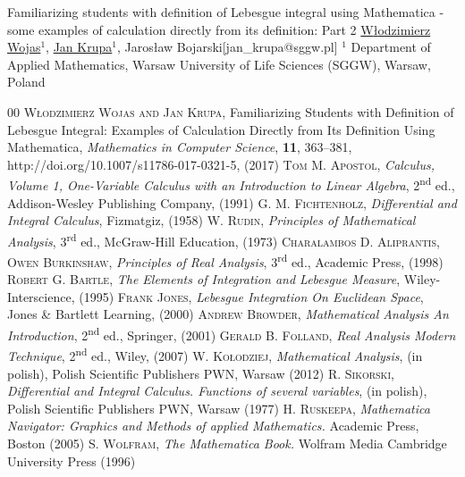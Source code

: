 \begin{abstract_online}{Familiarizing students with definition of Lebesgue integral  using Mathematica - some examples of calculation directly from its definition: Part 2}{%
        \underline{W{\l}odzimierz Wojas}$^{1}$, \underline{Jan Krupa}$^{1}$,  Jaros{\l}aw Bojarski}{[jan\_krupa@sggw.pl]
        }{%
        $^1$ Department of Applied Mathematics, Warsaw University of Life Sciences (SGGW), Warsaw, Poland}
\vspace{-2em}
\renewcommand\refname{{\normalsize References}}
\begin{thebibliography}{00}
\vspace{-2em}
\setlength{\itemsep}{-1mm}
  \textsc{W{\l}odzimierz Wojas and  Jan Krupa}, Familiarizing Students with Definition of Lebesgue Integral: Examples of Calculation Directly from Its Definition Using Mathematica, \emph{Mathematics in Computer Science}, \textbf{11}, 363--381, http://doi.org/10.1007/s11786-017-0321-5, (2017)
 \textsc{Tom M. Apostol}, \emph{Calculus, Volume 1, One-Variable Calculus with an Introduction to Linear Algebra}, 2\textsuperscript{nd} ed., Addison-Wesley Publishing Company, (1991)
 \textsc{G. M. Fichtenholz}, \emph{Differential and Integral Calculus}, Fizmatgiz, (1958)
 \textsc{W. Rudin}, \emph{Principles of Mathematical Analysis}, 3\textsuperscript{rd} ed., McGraw-Hill Education, (1973)
  \textsc{Charalambos D. Aliprantis, Owen Burkinshaw}, \emph{Principles of Real Analysis}, 3\textsuperscript{rd} ed., Academic Press,  (1998)
 \textsc{Robert G. Bartle}, \emph{The Elements of Integration and Lebesgue Measure}, Wiley-Interscience, (1995)
 \textsc{Frank Jones}, \emph{Lebesgue Integration On Euclidean Space}, Jones \& Bartlett Learning, (2000)
 \textsc{Andrew Browder}, \emph{Mathematical Analysis An Introduction}, 2\textsuperscript{nd} ed.,  Springer, (2001)
 \textsc{Gerald B. Folland},  \emph{Real Analysis Modern Technique}, 2\textsuperscript{nd} ed., Wiley, (2007)
 \textsc{W. Ko{\l}odziej}, \emph{Mathematical Analysis}, (in polish), Polish Scientific Publishers PWN, Warsaw (2012)
 \textsc{R. Sikorski}, \emph{Differential and Integral Calculus. Functions of several variables},  (in polish), Polish Scientific Publishers PWN, Warsaw (1977)
 \textsc{H. Ruskeepa}, \emph{Mathematica Navigator: Graphics and Methods of applied Mathematics.}
Academic Press, Boston (2005)
\textsc{S. Wolfram},  \emph{The Mathematica Book.} Wolfram Media Cambridge University Press (1996)
\end{thebibliography}
\end{abstract_online}